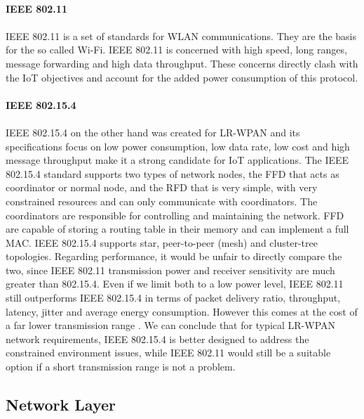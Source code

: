 \paragraph{\textbf{IEEE 802.11}}
\paragraph{}
IEEE 802.11 \cite{IEEE2012} is a set of standards for \gls{WLAN} communications. They are the basis for the so called Wi-Fi. IEEE 802.11 is concerned with high speed, long ranges, message forwarding and high data throughput. These concerns directly clash with the \gls{IoT} objectives and account for the added power consumption of this protocol.

\paragraph{\textbf{IEEE 802.15.4}}
\paragraph{}
IEEE 802.15.4 \cite{IEEEComputerSociety2011} on the other hand was created for \gls{LR-WPAN} and its specifications focus on low power consumption, low data rate, low cost and high message throughput make it a strong candidate for \gls{IoT} applications.
	The IEEE 802.15.4 standard supports two types of network nodes, the \gls{FFD} that acts as coordinator or normal node, and the \gls{RFD} that is very simple, with very constrained resources and can only communicate with coordinators. The coordinators are responsible for controlling and maintaining the network. \gls{FFD} are capable of storing a routing table in their memory and can implement a full \gls{MAC}.
	IEEE 802.15.4 supports star, peer-to-peer (mesh) and cluster-tree topologies.
	Regarding performance, it would be unfair to directly compare the two, since IEEE 802.11 transmission power and receiver sensitivity are much greater than 802.15.4. Even if we limit both to a low power level, IEEE 802.11 still outperforms IEEE 802.15.4 in terms of packet delivery ratio, throughput, latency, jitter and average energy consumption. However this comes at the cost of a far lower transmission range \cite{Transmission2011}.
	We can conclude that for typical \gls{LR-WPAN} network requirements, IEEE 802.15.4 is better designed to address the constrained environment issues, while IEEE 802.11 would still be a suitable option if a short transmission range is not a problem.

\subsection{Network Layer}
\label{sec:network_layer}

